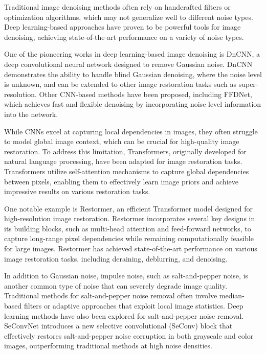 
Traditional image denoising methods often rely on handcrafted filters or optimization algorithms, which may not generalize well to different noise types. Deep learning-based approaches have proven to be powerful tools for image denoising, achieving state-of-the-art performance on a variety of noise types.

One of the pioneering works in deep learning-based image denoising is DnCNN\cite{Zhang2017}, a deep convolutional neural network designed to remove Gaussian noise. DnCNN demonstrates the ability to handle blind Gaussian denoising, where the noise level is unknown, and can be extended to other image restoration tasks such as super-resolution. Other CNN-based methods have been proposed, including FFDNet\cite{Zhang2018}, which achieves fast and flexible denoising by incorporating noise level information into the network.

While CNNs excel at capturing local dependencies in images, they often struggle to model global image context, which can be crucial for high-quality image restoration. To address this limitation, Transformers, originally developed for natural language processing, have been adapted for image restoration tasks. Transformers utilize self-attention mechanisms to capture global dependencies between pixels, enabling them to effectively learn image priors and achieve impressive results on various restoration tasks.

One notable example is Restormer\cite{Zamir2022}, an efficient Transformer model designed for high-resolution image restoration. Restormer incorporates several key designs in its building blocks, such as multi-head attention and feed-forward networks, to capture long-range pixel dependencies while remaining computationally feasible for large images. Restormer has achieved state-of-the-art performance on various image restoration tasks, including deraining, deblurring, and denoising.

In addition to Gaussian noise, impulse noise, such as salt-and-pepper noise, is another common type of noise that can severely degrade image quality. Traditional methods for salt-and-pepper noise removal often involve median-based filters or adaptive approaches that exploit local image statistics\cite{Memis2021}. Deep learning methods have also been explored for salt-and-pepper noise removal. SeConvNet introduces a new selective convolutional (SeConv) block that effectively restores salt-and-pepper noise corruption in both grayscale and color images, outperforming traditional methods at high noise densities.\cite{Rafiee2021}

